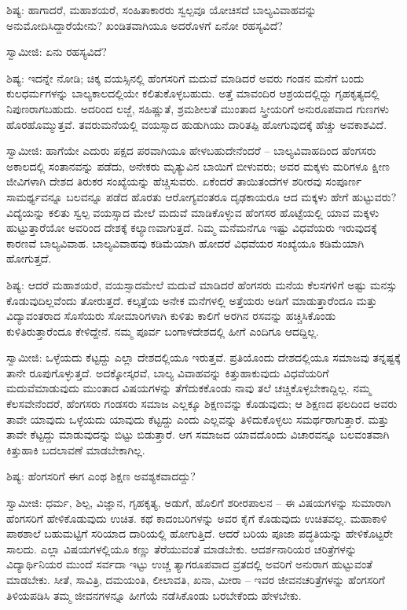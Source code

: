 ಶಿಷ್ಯ: ಹಾಗಾದರೆ, ಮಹಾಶಯರೆ, ಸಂಹಿತಾಕಾರರು ಸ್ವಲ್ಪವೂ ಯೋಚಿಸದೆ ಬಾಲ್ಯವಿವಾಹವನ್ನು ಅನುಮೋದಿಸಿದ್ದಾರೆಯೇನು? ಖಂಡಿತವಾಗಿಯೂ ಅದರೊಳಗೆ ಏನೋ ರಹಸ್ಯವಿದೆ?

ಸ್ವಾಮೀಜಿ: ಏನು ರಹಸ್ಯವಿದೆ?

ಶಿಷ್ಯ: ಇದನ್ನೇ ನೋಡಿ; ಚಿಕ್ಕ ವಯಸ್ಸಿನಲ್ಲಿ ಹೆಂಗಸರಿಗೆ ಮದುವೆ ಮಾಡಿದರೆ ಅವರು ಗಂಡನ ಮನೆಗೆ ಬಂದು ಕುಲಧರ್ಮಗಳನ್ನು ಬಾಲ್ಯಕಾಲದಲ್ಲಿಯೇ ಕಲಿತುಕೊಳ್ಳಬಹುದು. ಅತ್ತೆ ಮಾವಂದಿರ ಆಶ್ರಯದಲ್ಲಿದ್ದು ಗೃಹಕೃತ್ಯದಲ್ಲಿ ನಿಪುಣರಾಗಬಹುದು. ಅದರಿಂದ ಲಜ್ಜೆ, ಸಹಿಷ್ಣುತೆ, ಶ್ರಮಶೀಲತೆ ಮುಂತಾದ ಸ್ತ್ರೀಯರಿಗೆ ಅನುರೂಪವಾದ ಗುಣಗಳು ಹೊರಹೊಮ್ಮುತ್ತವೆ. ತವರುಮನೆಯಲ್ಲಿ ವಯಸ್ಸಾದ ಹುಡುಗಿಯು ದಾರಿತಪ್ಪಿ ಹೋಗುವುದಕ್ಕೆ ಹೆಚ್ಚು ಅವಕಾಶವಿದೆ.

ಸ್ವಾಮೀಜಿ: ಹಾಗೆಯೇ ಎದುರು ಪಕ್ಷದ ಪರವಾಗಿಯೂ ಹೇಳಬಹುದೇನೆಂದರೆ – ಬಾಲ್ಯವಿವಾಹದಿಂದ ಹೆಂಗಸರು ಅಕಾಲದಲ್ಲಿ ಸಂತಾನವನ್ನು ಪಡೆದು, ಅನೇಕರು ಮೃತ್ಯುವಿನ ಬಾಯಿಗೆ ಬೀಳುವರು; ಅವರ ಮಕ್ಕಳು ಮರಿಗಳೂ ಕ್ಷೀಣ ಜೀವಿಗಳಾಗಿ ದೇಶದ ತಿರುಕರ ಸಂಖ್ಯೆಯನ್ನು ಹೆಚ್ಚಿಸುವರು. ಏಕೆಂದರೆ ತಾಯಿತಂದೆಗಳ ಶರೀರವು ಸಂಪೂರ್ಣ ಸಾಮರ್ಥ್ಯವನ್ನೂ ಬಲವನ್ನೂ ಪಡೆದ ಹೊರತು ಆರೋಗ್ಯವಂತರೂ ದೃಢಕಾಯರೂ ಆದ ಮಕ್ಕಳು ಹೇಗೆ ಹುಟ್ಟುವರು? ವಿದ್ಯೆಯನ್ನು ಕಲಿತು ಸ್ವಲ್ಪ ವಯಸ್ಸಾದ ಮೇಲೆ ಮದುವೆ ಮಾಡಿಕೊಳ್ಳುವ ಹೆಂಗಸರ ಹೊಟ್ಟೆಯಲ್ಲಿ ಯಾವ ಮಕ್ಕಳು ಹುಟ್ಟುತ್ತಾರೆಯೋ ಅವರಿಂದ ದೇಶಕ್ಕೆ ಕಲ್ಯಾಣವಾಗುತ್ತದೆ. ನಿಮ್ಮ ಮನೆಮನೆಗೂ ಇಷ್ಟು ವಿಧವೆಯರು ಇರುವುದಕ್ಕೆ ಕಾರಣವೆ ಬಾಲ್ಯವಿವಾಹ. ಬಾಲ್ಯವಿವಾಹವು ಕಡಿಮೆಯಾಗಿ ಹೋದರೆ ವಿಧವೆಯರ ಸಂಖ್ಯೆಯೂ ಕಡಿಮೆಯಾಗಿ ಹೋಗುತ್ತದೆ.

ಶಿಷ್ಯ: ಆದರೆ ಮಹಾಶಯರೆ, ವಯಸ್ಸಾದಮೇಲೆ ಮದುವೆ ಮಾಡಿದರೆ ಹೆಂಗಸರು ಮನೆಯ ಕೆಲಸಗಳಿಗೆ ಅಷ್ಟು ಮನಸ್ಸು ಕೊಡುವುದಿಲ್ಲವೆಂದು ತೋರುತ್ತದೆ. ಕಲ್ಕತ್ತೆಯ ಅನೇಕ ಮನೆಗಳಲ್ಲಿ ಅತ್ತೆಯರು ಅಡಿಗೆ ಮಾಡುತ್ತಾರೆಂದೂ ಮತ್ತು ವಿದ್ಯಾವಂತರಾದ ಸೊಸೆಯರು ಸೋಮಾರಿಗಳಾಗಿ ಕುಳಿತು ಕಾಲಿಗೆ ಅರಗಿನ ರಸವನ್ನು ಹಚ್ಚಿಸಿಕೊಂಡು ಕುಳಿತಿರುತ್ತಾರೆಂದೂ ಕೇಳಿದ್ದೇನೆ. ನಮ್ಮ ಪೂರ್ವ ಬಂಗಾಳದೇಶದಲ್ಲಿ ಹೀಗೆ ಎಂದಿಗೂ ಆದದ್ದಿಲ್ಲ.

ಸ್ವಾಮೀಜಿ: ಒಳ್ಳೆಯದು ಕೆಟ್ಟದ್ದು ಎಲ್ಲಾ ದೇಶದಲ್ಲಿಯೂ ಇರುತ್ತವೆ. ಪ್ರತಿಯೊಂದು ದೇಶದಲ್ಲಿಯೂ ಸಮಾಜವು ತನ್ನಷ್ಟಕ್ಕೆ ತಾನೇ ರೂಪುಗೊಳ್ಳುತ್ತದೆ. ಅದಕ್ಕೋಸ್ಕರವೆ, ಬಾಲ್ಯ ವಿವಾಹವನ್ನು ಕಿತ್ತುಹಾಕುವುದು ವಿಧವೆಯರಿಗೆ ಮದುವೆಮಾಡುವುದು ಮುಂತಾದ ವಿಷಯಗಳನ್ನು ತೆಗೆದುಕಕೊಂಡು ನಾವು ತಲೆ ಚಚ್ಚಿಕೊಳ್ಳಬೇಕಾದ್ದಿಲ್ಲ. ನಮ್ಮ ಕೆಲಸವೇನೆಂದರೆ, ಹೆಂಗಸರು ಗಂಡಸರು ಸಮಾಜ ಎಲ್ಲಕ್ಕೂ ಶಿಕ್ಷಣವನ್ನು ಕೊಡುವುದು; ಆ ಶಿಕ್ಷಣದ ಫಲದಿಂದ ಅವರು ತಾವೇ ಯಾವುದು ಒಳ್ಳೆಯದು ಯಾವುದು ಕೆಟ್ಟದ್ದು ಎಂದು ಎಲ್ಲವನ್ನು ತಿಳಿದುಕೊಳ್ಳಲು ಸಮರ್ಥರಾಗುತ್ತಾರೆ. ಮತ್ತು ತಾವೇ ಕೆಟ್ಟದ್ದು ಮಾಡುವುದನ್ನು ಬಿಟ್ಟು ಬಿಡುತ್ತಾರೆ. ಆಗ ಸಮಾಜದ ಯಾವದೊಂದು ವಿಚಾರವನ್ನೂ ಬಲವಂತವಾಗಿ ಕಿತ್ತುಹಾಕಿ ಬದಲಾವಣೆ ಮಾಡಬೇಕಾಗಿಲ್ಲ.

ಶಿಷ್ಯ: ಹೆಂಗಸರಿಗೆ ಈಗ ಎಂಥ ಶಿಕ್ಷಣ ಅವಶ್ಯಕವಾದದ್ದು?

ಸ್ವಾಮೀಜಿ: ಧರ್ಮ, ಶಿಲ್ಪ, ವಿಜ್ಞಾನ, ಗೃಹಕೃತ್ಯ, ಅಡುಗೆ, ಹೊಲಿಗೆ ಶರೀರಪಾಲನ – ಈ ವಿಷಯಗಳನ್ನು ಸುಮಾರಾಗಿ ಹೆಂಗಸರಿಗೆ ಹೇಳಿಕೊಡುವುದು ಉಚಿತ. ಕಥೆ ಕಾದಂಬರಿಗಳನ್ನು ಅವರ ಕೈಗೆ ಕೊಡುವುದು ಉಚಿತವಲ್ಲ. ಮಹಾಕಾಳಿ ಪಾಠಶಾಲೆ ಬಹುಮಟ್ಟಿಗೆ ಸರಿಯಾದ ದಾರಿಯಲ್ಲಿ ಹೋಗುತ್ತಿದೆ. ಆದರೆ ಬರಿಯ ಪೂಜಾ ಪದ್ಧತಿಯನ್ನು ಹೇಳಿಕೊಟ್ಟರೇ ಸಾಲದು. ಎಲ್ಲಾ ವಿಷಯಗಳಲ್ಲಿಯೂ ಕಣ್ಣು ತೆರೆಯುವಂತೆ ಮಾಡಬೇಕು. ಆದರ್ಶನಾರಿಯರ ಚರಿತ್ರೆಗಳನ್ನು ವಿದ್ಯಾರ್ಥಿನಿಯರ ಮುಂದೆ ಸರ್ವದಾ ಇಟ್ಟು ಉಚ್ಚ ತ್ಯಾಗರೂಪವಾದ ವ್ರತದಲ್ಲಿ ಅವರಿಗೆ ಅನುರಾಗ ಹುಟ್ಟುವಂತೆ ಮಾಡಬೇಕು. ಸೀತೆ, ಸಾವಿತ್ರಿ, ದಮಯಂತಿ, ಲೀಲಾವತಿ, ಖನಾ, ಮೀರಾ – ಇವರ ಜೀವನಚರಿತ್ರೆಗಳನ್ನು ಹೆಂಗಸರಿಗೆ ತಿಳಿಯಪಡಿಸಿ ತಮ್ಮ ಜೀವನಗಳನ್ನೂ ಹೀಗೆಯೆ ನಡೆಸಿಕೊಂಡು ಬರಬೇಕೆಂದು ಹೇಳಬೇಕು.

